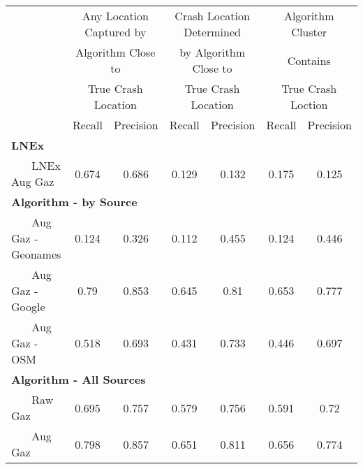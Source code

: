 \begin{tabular}{l cc | cc | cc } \hline  & \multicolumn{2}{c|}{Any Location Captured by} & \multicolumn{2}{c|}{Crash Location Determined} & \multicolumn{2}{c}{Algorithm Cluster} \\  & \multicolumn{2}{c|}{Algorithm Close to} & \multicolumn{2}{c|}{by Algorithm Close to}  & \multicolumn{2}{c}{Contains} \\  & \multicolumn{2}{c|}{True Crash Location} & \multicolumn{2}{c|}{True Crash Location}  & \multicolumn{2}{c}{True Crash Loction} \\  \hline  & Recall & Precision & Recall & Precision & Recall & Precision \\ \hline \multicolumn{3}{l|}{\bf LNEx} & & & & \\  ~~~ LNEx Aug Gaz & 0.674  &  0.686  &  0.129  &  0.132  &  0.175  &  0.125  \\ \multicolumn{3}{l|}{\bf Algorithm - by Source} & & & & \\  ~~~ Aug Gaz - Geonames & 0.124  &  0.326  &  0.112  &  0.455  &  0.124  &  0.446  \\  ~~~ Aug Gaz - Google & 0.79  &  0.853  &  0.645  &  0.81  &  0.653  &  0.777  \\  ~~~ Aug Gaz - OSM & 0.518  &  0.693  &  0.431  &  0.733  &  0.446  &  0.697  \\ \multicolumn{3}{l|}{\bf Algorithm - All Sources} & & & & \\  ~~~ Raw Gaz & 0.695  &  0.757  &  0.579  &  0.756  &  0.591  &  0.72  \\  ~~~ Aug Gaz & 0.798  &  0.857  &  0.651  &  0.811  &  0.656  &  0.774  \\ \hline \end{tabular} 